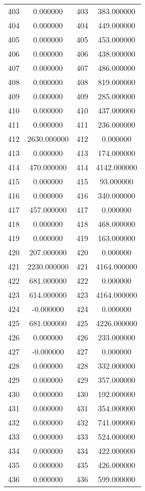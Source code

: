 \documentclass[12pt]{article}
\begin{document}
\begin{longtable}{@{}cccc@{}}
403 & 0.000000 & 403 & 383.000000 \\
404 & 0.000000 & 404 & 449.000000 \\
405 & 0.000000 & 405 & 453.000000 \\
406 & 0.000000 & 406 & 438.000000 \\
407 & 0.000000 & 407 & 486.000000 \\
408 & 0.000000 & 408 & 819.000000 \\
409 & 0.000000 & 409 & 285.000000 \\
410 & 0.000000 & 410 & 437.000000 \\
411 & 0.000000 & 411 & 236.000000 \\
412 & 2630.000000 & 412 & 0.000000 \\
413 & 0.000000 & 413 & 174.000000 \\
414 & 470.000000 & 414 & 4142.000000 \\
415 & 0.000000 & 415 & 93.000000 \\
416 & 0.000000 & 416 & 340.000000 \\
417 & 457.000000 & 417 & 0.000000 \\
418 & 0.000000 & 418 & 468.000000 \\
419 & 0.000000 & 419 & 163.000000 \\
420 & 207.000000 & 420 & 0.000000 \\
421 & 2230.000000 & 421 & 4164.000000 \\
422 & 681.000000 & 422 & 0.000000 \\
423 & 614.000000 & 423 & 4164.000000 \\
424 & -0.000000 & 424 & 0.000000 \\
425 & 681.000000 & 425 & 4226.000000 \\
426 & 0.000000 & 426 & 233.000000 \\
427 & -0.000000 & 427 & 0.000000 \\
428 & 0.000000 & 428 & 332.000000 \\
429 & 0.000000 & 429 & 357.000000 \\
430 & 0.000000 & 430 & 192.000000 \\
431 & 0.000000 & 431 & 354.000000 \\
432 & 0.000000 & 432 & 741.000000 \\
433 & 0.000000 & 433 & 524.000000 \\
434 & 0.000000 & 434 & 422.000000 \\
435 & 0.000000 & 435 & 426.000000 \\
436 & 0.000000 & 436 & 599.000000 \\

\end{longtable}
\end{document}
